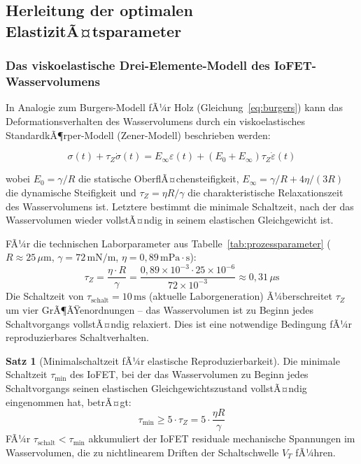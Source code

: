 ﻿\documentclass[a4paper,12pt]{scrreprt}
\theoremstyle{definition}
\newtheorem{satz}{Satz}[section]
\begin{document}
\subsection{Herleitung der optimalen ElastizitÃ¤tsparameter}

\subsubsection{Das viskoelastische Drei-Elemente-Modell des IoFET-Wasservolumens}

In Analogie zum Burgers-Modell fÃ¼r Holz (Gleichung~\eqref{eq:burgers}) kann
das Deformationsverhalten des Wasservolumens durch ein viskoelastisches
StandardkÃ¶rper-Modell (Zener-Modell) beschrieben werden:

\begin{equation}
	\sigma(t) + \tau_Z \dot{\sigma}(t) = E_\infty \varepsilon(t)
	+ \left(E_0 + E_\infty\right) \tau_Z \dot{\varepsilon}(t)
	\label{eq:zener_modell}
\end{equation}

wobei $E_0 = \gamma / R$ die statische OberflÃ¤chensteifigkeit,
$E_\infty = \gamma / R + 4\eta / (3 R)$ die dynamische Steifigkeit und
$\tau_Z = \eta R / \gamma$ die charakteristische Relaxationszeit des
Wasservolumens ist. Letztere bestimmt die minimale Schaltzeit, nach der
das Wasservolumen wieder vollstÃ¤ndig in seinem elastischen Gleichgewicht ist.

FÃ¼r die technischen Laborparameter aus Tabelle~\ref{tab:prozessparameter}
($R \approx 25\,\mu$m, $\gamma = 72\,\mathrm{mN/m}$, $\eta = 0{,}89\,\mathrm{mPa\cdot s}$):
\begin{equation}
	\tau_Z = \frac{\eta \cdot R}{\gamma}
	= \frac{0{,}89 \times 10^{-3} \cdot 25 \times 10^{-6}}{72 \times 10^{-3}}
	\approx 0{,}31\,\mu\mathrm{s}
	\label{eq:tau_zener_wert}
\end{equation}
Die Schaltzeit von $\tau_{\mathrm{schalt}} = 10\,\mathrm{ms}$ (aktuelle
Laborgeneration) Ã¼berschreitet $\tau_Z$ um vier GrÃ¶ÃŸenordnungen -- das
Wasservolumen ist zu Beginn jedes Schaltvorgangs vollstÃ¤ndig relaxiert.
Dies ist eine notwendige Bedingung fÃ¼r reproduzierbares Schaltverhalten.

\begin{satz}[Minimalschaltzeit fÃ¼r elastische Reproduzierbarkeit]
	Die minimale Schaltzeit $\tau_{\mathrm{min}}$ des IoFET, bei der das
	Wasservolumen zu Beginn jedes Schaltvorgangs seinen elastischen
	Gleichgewichtszustand vollstÃ¤ndig eingenommen hat, betrÃ¤gt:
	\begin{equation}
		\tau_{\mathrm{min}} \geq 5 \cdot \tau_Z = 5 \cdot \frac{\eta R}{\gamma}
		\label{eq:min_schaltzeit}
	\end{equation}
	FÃ¼r $\tau_{\mathrm{schalt}} < \tau_{\mathrm{min}}$ akkumuliert der IoFET
	residuale mechanische Spannungen im Wasservolumen, die zu nichtlinearem
	Driften der Schaltschwelle $V_T$ fÃ¼hren.
\end{satz}
\end{document}
